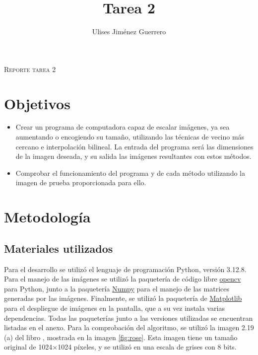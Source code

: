 \documentclass[12pt]{article}
\title{Tarea 2}
\author{Ulises Jiménez Guerrero}
\begin{document}


\begin{center}
	\Large
		{\scshape Reporte tarea 2}
\end{center}

\section{Objetivos}
\begin{itemize}
	\item Crear un programa de computadora capaz de escalar imágenes, ya sea aumentando o encogiendo su tamaño, utilizando las técnicas de vecino más cercano e interpolación bilineal. La entrada del programa será las dimensiones de la imagen deseada, y su salida las imágenes 
	resultantes con estos métodos.
	
	\item Comprobar el funcionamiento del programa y de cada método utilizando la imagen de prueba proporcionada para ello. 
\end{itemize}
 
 
\section{Metodología}
\subsection{Materiales utilizados}

Para el desarrollo se utilizó el lenguaje de programación Python, versión 3.12.8. Para el manejo de las imágenes se utilizó la paquetería de código libre \href{https://pypi.org/project/opencv-python/}{opencv} para Python, junto a la paquetería \href{https://pypi.org/project/numpy/}{Numpy} para el manejo de las matrices generadas por las imágenes. Finalmente, se utilizó la paquetería de \href{https://pypi.org/project/matplotlib/}{Matplotlib} para el despliegue de imágenes en la pantalla, que a su vez instala varias dependencias. Todas las paqueterías junto a las versiones utilizadas se encuentran listadas en el anexo. Para la comprobación del algoritmo, se utilizó la imagen 2.19 (a) del libro
\cite{gonzalezDigitalImageProcessing2017}
, mostrada en la imagen \ref{fig:rose}. Esta imagen tiene un tamaño original de 
1024$\times$1024 píxeles, y se utilizó en una escala de grises con 8 bits.
\end{document}
